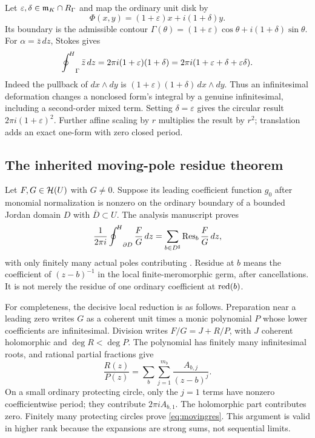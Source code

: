 \documentclass[11pt,letterpaper]{article}
\theoremstyle{definition}
\theoremstyle{remark}
\newcommand{\Res}{\operatorname{Res}}\newcommand{\res}{\operatorname{res}}\newcommand{\ord}{\operatorname{ord}}\newcommand{\Tr}{\operatorname{Tr}}
\numberwithin{equation}{section}
\begin{document}
\begin{example}\label{ex:ellipse}
Let $\varepsilon,\delta\in\mathfrak m_K\cap R_\Gamma$ and map the ordinary unit disk by
\[
 \Phi(x,y)=(1+\varepsilon)x+i(1+\delta)y.
\]
Its boundary is the admissible contour
$\Gamma(\theta)=(1+\varepsilon)\cos\theta+i(1+\delta)\sin\theta$.
For $\alpha=\bar z\,dz$, Stokes gives
\begin{equation}\label{eq:ellipse}
 \mathop{\oint^{\!H}}\nolimits_\Gamma\bar z\,dz
 =2\pi i(1+\varepsilon)(1+\delta)
 =2\pi i(1+\varepsilon+\delta+\varepsilon\delta).
\end{equation}
Indeed the pullback of $dx\wedge dy$ is
$(1+\varepsilon)(1+\delta)\,dx\wedge dy$.
Thus an infinitesimal deformation changes a nonclosed form's integral by a genuine infinitesimal, including a second-order mixed term. Setting $\delta=\varepsilon$ gives the circular result $2\pi i(1+\varepsilon)^2$. Further affine scaling by $r$ multiplies the result by $r^2$; translation adds an exact one-form with zero closed period.
\end{example}

\subsection{The inherited moving-pole residue theorem}
Let $F,G\in\mathcal H(U)$ with $G\ne0$. Suppose its leading coefficient function $g_0$ after monomial normalization is nonzero on the ordinary boundary of a bounded Jordan domain $D$ with $\overline D\subset U$. The analysis manuscript proves
\begin{equation}\label{eq:movingres}
 \frac1{2\pi i}\HCoint_{\partial D}\frac{F}{G}\,dz
 =\sum_{b\in D\sh}\Res_b\frac{F}{G}\,dz,
\end{equation}
with only finitely many actual poles contributing \cite[section on moving poles]{Analysis}. Residue at $b$ means the coefficient of $(z-b)^{-1}$ in the local finite-meromorphic germ, after cancellations. It is not merely the residue of one ordinary coefficient at $\operatorname{red}(b)$.

For completeness, the decisive local reduction is as follows. Preparation near a leading zero writes $G$ as a coherent unit times a monic polynomial $P$ whose lower coefficients are infinitesimal. Division writes $F/G=J+R/P$, with $J$ coherent holomorphic and $\deg R<\deg P$. The polynomial has finitely many infinitesimal roots, and rational partial fractions give
\[
 \frac{R(z)}{P(z)}=\sum_b\sum_{j=1}^{m_b}\frac{A_{b,j}}{(z-b)^j}.
\]
On a small ordinary protecting circle, only the $j=1$ terms have nonzero coefficientwise period; they contribute $2\pi i A_{b,1}$. The holomorphic part contributes zero. Finitely many protecting circles prove \eqref{eq:movingres}. This argument is valid in higher rank because the expansions are strong sums, not sequential limits.
\end{document}
